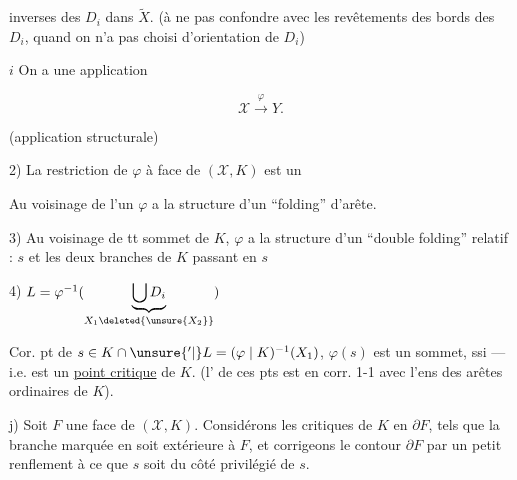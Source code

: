 
inverses des $D_i$ dans $\widetilde X$. (à ne pas confondre avec les revêtements des bords des $D_i$, quand on n'a pas choisi d'orientation de $D_i$)

\textcircled{$i$} On a une application

\[ \mathcal X \xrightarrow{\varphi} Y. \]

(application structurale) 

2) La restriction de $\varphi$ à  face de $(\mathcal X,K)$ est un   



Au voisinage de l'un   $\varphi$ a la structure d'un ``folding'' d'arête.

3) Au voisinage de tt  sommet de $K$, $\varphi$ a la structure d'un ``double folding'' relatif : $s$ et les deux branches de $K$ passant en $s$

4)     \quad $L=\varphi^{-1}(\underbrace{\bigcup D_i}_{X_1\deleted{\unsure{X_2}}})$


Cor.   pt de $s\in K\cap\unsure{\vphantom L'|{}}L=(\varphi\mid K)^{-1}(X_1)$,  $\varphi(s)$ est un sommet, ssi    --- i.e. est un \uline{point critique} de $K$. (l' de ces pts est en corr. 1-1 avec l'ens des arêtes ordinaires de $K$).

 j) Soit $F$ une face de $(\mathcal X,K)$. Considérons les   critiques de $K$ en $\partial F$, tels que la branche marquée en    soit extérieure à $F$, et corrigeons le contour $\partial F$ par un petit renflement   à ce que $s$ soit du côté privilégié de $s$.

